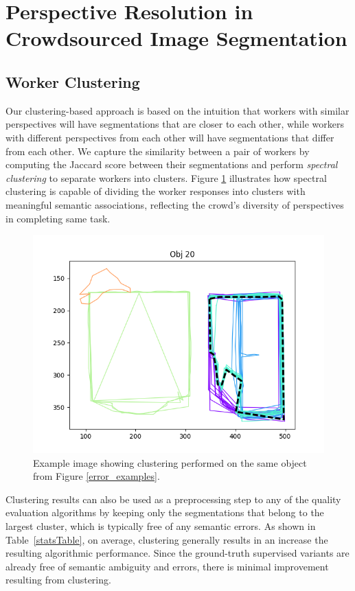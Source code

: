 \section{Perspective Resolution in Crowdsourced Image Segmentation}
\subsection{Worker Clustering}
Our clustering-based approach is based on the intuition that workers with similar perspectives  will have segmentations that are closer to each other, while workers with different perspectives from each other will have segmentations that differ from each other. We capture the similarity between a pair of workers by computing the Jaccard score between their segmentations and perform {\em spectral clustering} to separate workers into clusters. Figure \ref{cluster_example} illustrates how spectral clustering is capable of dividing the worker responses into clusters with meaningful semantic associations, reflecting the crowd's diversity of perspectives in completing same task.
    \begin{figure}[ht!]
      \centering
      \includegraphics[width=\textwidth]{plots/20.png}
      \caption{Example image showing clustering performed on the same object from Figure \ref{error_examples}.}
      \label{cluster_example}
    \end{figure}
\par Clustering results can also be used as a preprocessing step to any of the quality evaluation algorithms by keeping only the segmentations that belong to the largest cluster, which is typically free of any semantic errors. As shown in Table~\ref{statsTable}, on average, clustering generally results in an increase the resulting algorithmic performance. Since the ground-truth supervised variants are already free of semantic ambiguity and errors, there is minimal improvement resulting from clustering. %
